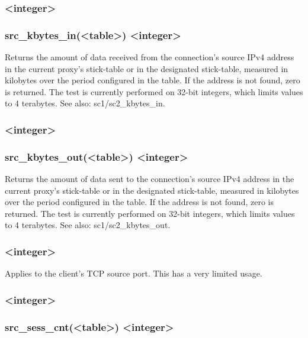 \subsubsection[src\_kbytes\_in]{ <integer>}
\subsubsection*{src\_kbytes\_in(<table>) <integer>}

Returns the amount of data received from the connection's source IPv4 address
in the current proxy's stick-table or in the designated stick-table, measured
in kilobytes over the period configured in the table. If the address is not
found, zero is returned. The test is currently performed on 32-bit integers,
which limits values to 4 terabytes.
See also: sc1/sc2\_kbytes\_in.

\subsubsection[src\_kbytes\_out]{ <integer>}
\subsubsection*{src\_kbytes\_out(<table>) <integer>}

Returns the amount of data sent to the connection's source IPv4 address in
the current proxy's stick-table or in the designated stick-table, measured
in kilobytes over the period configured in the table. If the address is not
found, zero is returned. The test is currently performed on 32-bit integers,
which limits values to 4 terabytes.
See also: sc1/sc2\_kbytes\_out.

\subsubsection[src\_port]{ <integer>}

  Applies to the client's TCP source port. This has a very limited usage.

\subsubsection[src\_sess\_cnt]{ <integer>}
\subsubsection*{src\_sess\_cnt(<table>) <integer>}

